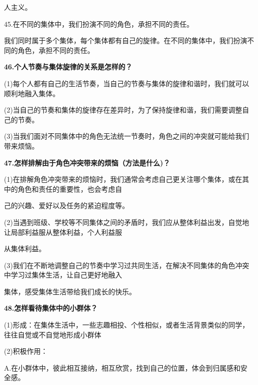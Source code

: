 \documentclass[lang=cn,11pt]{elegantbook}
\begin{document}
人主义。\par

45.在不同的集体中，我们扮演不同的角色，承担不同的责任。\par

我们同时属于多个集体，每个集体都有自己的旋律。在不同的集体中，我们扮演不同的角色，承担不同的责任。\par

\textbf{46.个人节奏与集体旋律的关系是怎样的？}\par

(1)每个人都有自己的生活节奏，当自己的节奏与集体的旋律和谐时，我们就可以顺利地融入集体。\par

(2)当自己的节奏和集体的旋律存在差异时，为了保持旋律和谐，我们需要调整自己的节奏。\par

(3)当我们面对不同集体中的角色无法统一节奏时，角色之间的冲突就可能给我们带来烦恼。\par

\textbf{47.怎样排解由于角色冲突带来的烦恼（方法是什么)？}\par

(1)在排解角色冲突带来的烦恼时，我们通常会考虑自己更关注哪个集体，或在其中的角色和责任的重要性，也会考虑自\par

己的兴趣、爱好以及任务的紧迫程度等。\par

(2)当遇到班级、学校等不同集体之间的矛盾时，我们应从整体利益出发，自觉地让局部利益服从整体利益，个人利益服\par

从集体利益。\par

(3)我们在不断地调整自己的节奏中学习过共同生活，在解决不同集体的角色冲突中学习过集体生活，让自己更好地融入\par

集体，感受集体生活带给我们成长的快乐。\par

\textbf{48.怎样看待集体中的小群体？}\par

(1)形成：在集体生活中，一些志趣相投、个性相似，或者生活背景类似的同学，往往自觉或不自觉地形成小群体\par

(2)积极作用：\par

A.在小群体中，彼此相互接纳，相互欣赏，找到自己的位置，体会到归属感和安全感。\par
\end{document}

